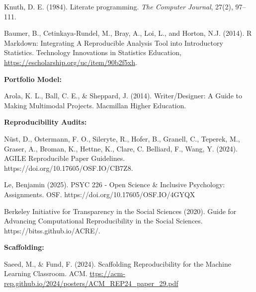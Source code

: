 \documentclass[11pt]{article}
\begin{document}
Knuth, D. E. (1984). Literate programming. \emph{The Computer Journal}, 27(2), 97–111.

Baumer, B., Cetinkaya-Rundel, M., Bray, A., Loi, L., and Horton, N.J. (2014). R Markdown: Integrating A Reproducible Analysis Tool into Introductory Statistics.
Technology Innovations in Statistics Education, \url{https://escholarship.org/uc/item/90b2f5xh}.

\vspace{.1in}
\noindent
{\bf Portfolio Model:}

Arola, K. L., Ball, C. E., \& Sheppard, J. (2014). Writer/Designer: A Guide to Making Multimodal Projects. Macmillan Higher Education.

\vspace{.1in}
\noindent
{\bf Reproducibility Audits:}

Nüst, D., Ostermann, F. O., Sileryte, R., Hofer, B., Granell, C., Teperek, M., Graser, A., Broman, K., Hettne, K., Clare, C. Belliard, F., Wang, Y. (2024). AGILE Reproducible Paper Guidelines. https://doi.org/10.17605/OSF.IO/CB7Z8.

Le, Benjamin (2025). PSYC 226 - Open Science \& Inclusive Psychology: Assignments. OSF. https://doi.org/10.17605/OSF.IO/4GYQX 

Berkeley Initiative for Transparency in the Social Sciences (2020). Guide for Advancing Computational Reproducibility in the Social Sciences. https://bitss.github.io/ACRE/.

\vspace{.1in}
\noindent
{\bf Scaffolding:}

Saeed, M., \& Fund, F. (2024). Scaffolding Reproducibility for the Machine Learning Classroom. ACM. \url{ttps://acm-rep.github.io/2024/posters/ACM_REP24_paper_29.pdf}


{}

\end{document}
